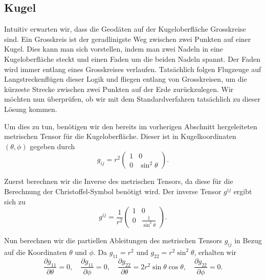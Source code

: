 %
%
%
%
\subsection{Kugel\label{geodaeten:section:Standardverfahren:Kugel}}

Intuitiv erwarten wir, dass die Geodäten auf der Kugeloberfläche Grosskreise sind.
Ein Grosskreis ist der geradlinigste Weg zwischen zwei Punkten auf einer Kugel.
Dies kann man sich vorstellen, indem man zwei Nadeln in eine Kugeloberfläche steckt und einen Faden um die beiden Nadeln spannt.
Der Faden wird immer entlang eines Grosskreises verlaufen.
Tatsächlich folgen Flugzeuge auf Langstreckenflügen dieser Logik und fliegen entlang von Grosskreisen, um die kürzeste Strecke zwischen zwei Punkten auf der Erde zurückzulegen.
Wir möchten nun überprüfen, ob wir mit dem Standardverfahren tatsächlich zu dieser Lösung kommen.

Um dies zu tun, benötigen wir den bereits im vorherigen Abschnitt hergeleiteten metrischen Tensor für die Kugeloberfläche.
Dieser ist in Kugelkoordinaten $(\theta, \phi)$ gegeben durch
\begin{equation}
	g_{ij} = r^2 \begin{pmatrix}
		1 & 0 \\
		0 & \sin^2\theta
	\end{pmatrix}.
\end{equation}

Zuerst berechnen wir die Inverse des metrischen Tensors, da diese für die Berechnung der Christoffel-Symbol benötigt wird.
Der inverse Tensor $g^{ij}$ ergibt sich zu
\begin{equation}
	g^{ij} = \frac{1}{r^2} 
	\begin{pmatrix}
		1 & 0 \\
		0 & \frac{1}{\sin^2\theta}
	\end{pmatrix}.
	\label{geodaeten:equation:StaKugel:TensorInverse}
\end{equation}

Nun berechnen wir die partiellen Ableitungen des metrischen Tensors $g_{ij}$ in Bezug auf die Koordinaten $\theta$ und $\phi$.
Da $g_{11} = r^2$ und $g_{22} = r^2 \sin^2\theta$, erhalten wir
\begin{equation}
	\frac{\partial g_{11}}{\partial \theta} = 0, \quad \frac{\partial g_{11}}{\partial \phi} = 0, \quad \frac{\partial g_{22}}{\partial \theta} = 2r^2 \sin\theta \cos\theta, \quad \frac{\partial g_{22}}{\partial \phi} = 0.
	\label{geodaeten:equation:StaKugel:Ableitungen}
\end{equation}

